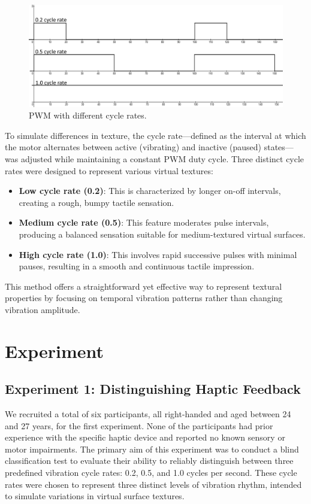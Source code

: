\begin{figure}[H]\centering
	\includegraphics[width=1\textwidth]{Pictures/PWM_3.png}%
	\caption{PWM with different cycle rates.}\label{fig:pwm_3}%
	
\end{figure}

To simulate differences in texture, the cycle rate—defined as the interval at which the motor alternates between active (vibrating) and inactive (paused) states—was adjusted while maintaining a constant PWM duty cycle. Three distinct cycle rates were designed to represent various virtual textures:

\begin{itemize}
  \item \textbf{Low cycle rate (0.2)}: This is characterized by longer on-off intervals, creating a rough, bumpy tactile sensation.
  \item \textbf{Medium cycle rate (0.5)}: This feature moderates pulse intervals, producing a balanced sensation suitable for medium-textured virtual surfaces.
  \item \textbf{High cycle rate (1.0)}: This involves rapid successive pulses with minimal pauses, resulting in a smooth and continuous tactile impression.
\end{itemize}

This method offers a straightforward yet effective way to represent textural properties by focusing on temporal vibration patterns rather than changing vibration amplitude.

\newpage
\section{Experiment}

\subsection{Experiment 1: Distinguishing Haptic Feedback}
We recruited a total of six participants, all right-handed and aged between 24 and 27 years, for the first experiment. None of the participants had prior experience with the specific haptic device and reported no known sensory or motor impairments. The primary aim of this experiment was to conduct a blind classification test to evaluate their ability to reliably distinguish between three predefined vibration cycle rates: 0.2, 0.5, and 1.0 cycles per second. These cycle rates were chosen to represent three distinct levels of vibration rhythm, intended to simulate variations in virtual surface textures.


